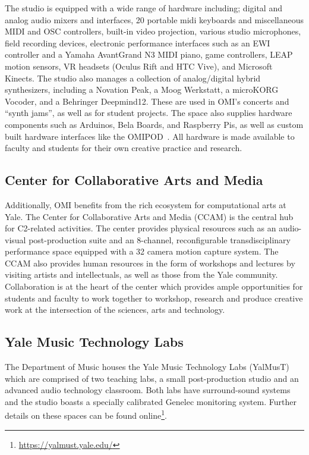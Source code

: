 The studio is equipped with a wide range of hardware including; digital and analog audio mixers and interfaces, 20 portable midi keyboards and miscellaneous MIDI and OSC controllers, built-in video projection, various studio microphones, field recording devices, electronic performance interfaces such as an EWI controller and a Yamaha AvantGrand N3 MIDI piano, game controllers, LEAP motion sensors, VR headsets (Oculus Rift and HTC Vive), and Microsoft Kinects. The studio also manages a collection of analog/digital hybrid synthesizers, including a Novation Peak, a Moog Werkstatt, a microKORG Vocoder, and a Behringer Deepmind12. These are used in OMI's concerts and ``synth jams'', as well as for student projects. The space also supplies hardware components such as Arduinos, Bela Boards, and Raspberry Pis, as well as custom built hardware interfaces like the OMIPOD~\cite{omipod}. All hardware is made available to faculty and students for their own creative practice and research. 

\subsection{Center for Collaborative Arts and Media}

Additionally, OMI benefits from the rich ecosystem for computational arts at Yale. The Center for Collaborative Arts and Media (CCAM) is the central hub for C2-related activities. The center provides physical resources such as an audio-visual post-production suite and an 8-channel, reconfigurable transdisciplinary performance space equipped with a 32 camera motion capture system. The CCAM also provides human resources in the form of workshops and lectures by visiting artists and intellectuals, as well as those from the Yale community. Collaboration is at the heart of the center which provides ample opportunities for students and faculty to work together to workshop, research and produce creative work at the intersection of the sciences, arts and technology.

\subsection{Yale Music Technology Labs}

The Department of Music houses the Yale Music Technology Labs (YalMusT) which are comprised of two teaching labs, a small post-production studio and an advanced audio technology classroom. Both labs have surround-sound systems and the studio boasts a specially calibrated Genelec monitoring system. Further details on these spaces can be found online\footnote{\url{https://yalmust.yale.edu/}}.

